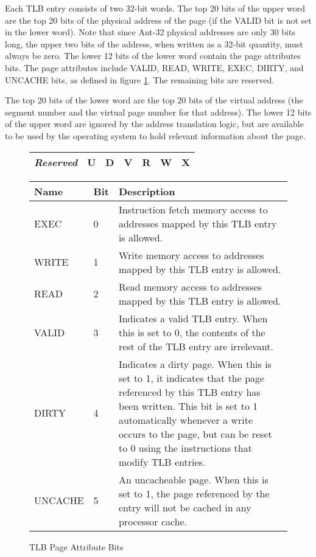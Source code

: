 Each TLB entry consists of two 32-bit words.  The top 20 bits of the
upper word are the top 20 bits of the physical address of the page (if
the VALID bit is not set in the lower word).  Note that since Ant-32
physical addresses are only 30 bits long, the upper two bits of the
address, when written as a 32-bit quantity, must always be zero.  The
lower 12 bits of the lower word contain the page attributes bits.  The
page attributes include {\sc VALID}, {\sc READ}, {\sc WRITE}, {\sc
EXEC}, {\sc DIRTY}, and {\sc UNCACHE} bits, as defined in figure
\ref{TLB-attr-bits}.  The remaining bits are reserved.

The top 20 bits of the lower word are the top 20 bits of the virtual
address (the segment number and the virtual page number for that
address).  The lower 12 bits of the upper word are ignored by the
address translation logic, but are available to be used by the
operating system to hold relevant information about the page.

\begin{figure}[ht]
\caption{\label{TLB-attr-bits} TLB Page Attribute Bits}

\begin{center}
\begin{tabular}{|p{1.0in}|p{0.2in}|p{0.2in}|p{0.2in}|p{0.2in}|p{0.2in}|p{0.2in}|}
\hline
	{\em Reserved} & U & D & V & R & W & X \\
\hline
\end{tabular}
\end{center}

\begin{center}
\begin{tabular}{|l|l|p{4in}|}
\hline
{\bf Name}	& {\bf Bit}	& {\bf Description} \\
\hline
\hline
{\sc EXEC}	& 0	& Instruction fetch memory access to addresses mapped
				by this TLB entry is allowed. \\
\hline
{\sc WRITE}	& 1 	& Write memory access to addresses mapped
				by this TLB entry is allowed. \\
\hline
{\sc READ}	& 2	& Read memory access to addresses mapped
				by this TLB entry is allowed.  \\
\hline
{\sc VALID}	& 3	& Indicates a valid TLB entry.  When this is
			set to 0, the contents of the rest of the TLB
			entry are irrelevant.  \\

\hline
{\sc DIRTY}	& 4	& Indicates a dirty page.  When this is set to 1,
			it indicates that the page referenced by this TLB
			entry has been written.  This bit is set to 1
			automatically whenever a write occurs to the page,
			but can be reset to 0 using the instructions that
			modify TLB entries. \\

\hline
{\sc UNCACHE}	& 5	& An uncacheable page.  When this is set to 1,
			the page referenced by the entry will not be
			cached in any processor cache.  \\

\hline
\end{tabular}
\end{center}
\end{figure}

